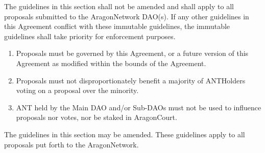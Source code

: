 
\label{chap:ANDAOAgreement}

\begin{enumerate}
	\label{sec:ImmutableGuidelines}
	
	The guidelines in this section shall not be amended and shall apply to all proposals submitted to the \gls{AragonNetwork} \ac{DAO}(s).
	If any other guidelines in this Agreement conflict with these immutable guidelines, the immutable guidelines shall take priority for enforcement purposes.
	\begin{enumerate}
		
		\begin{enumerate}
			\item Proposals must be governed by this Agreement, or a future version of this Agreement as modified within the bounds of the Agreement.
			\item Proposals must not disproportionately benefit a majority of \glspl{ANTHolder} voting on a proposal over the minority.
			\item \ac{ANT} held by the Main \ac{DAO} and/or Sub-\acp{DAO} must not be used to influence proposals nor votes, nor be staked in \gls{AragonCourt}.
		\end{enumerate}
	
	\end{enumerate}

	\label{sec:MutableGuidelines}

	The guidelines in this section may be amended.
	These guidelines apply to all proposals put forth to the \gls{AragonNetwork}.
	\begin{enumerate}
		

\end{enumerate}
\end{enumerate}
